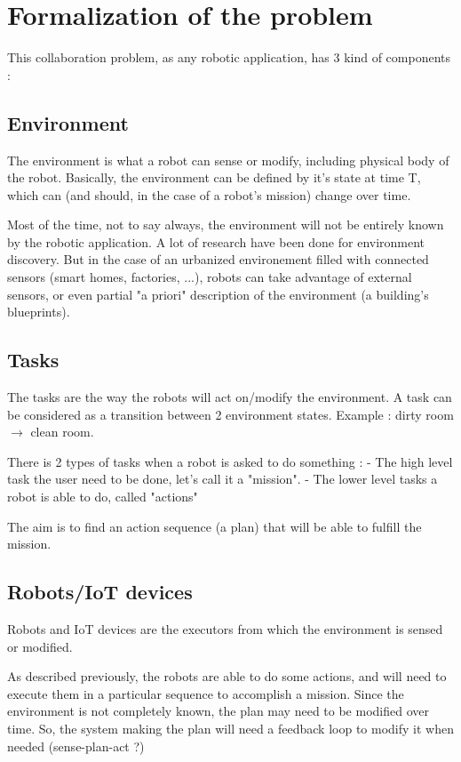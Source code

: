 \section{Formalization of the problem}

This collaboration problem, as any robotic application, has 3 kind of components : 

\subsection{Environment}

The environment is what a robot can sense or modify, including physical body of the robot.
Basically, the environment can be defined by it's state at time T, which can (and should, in the case of a robot's mission) change over time.

Most of the time, not to say always, the environment will not be entirely known by the robotic application.
A lot of research have been done for environment discovery.
But in the case of an urbanized environement filled with connected sensors (smart homes, factories, ...), robots can take advantage of external sensors, or even partial "a priori" description of the environment (a building's blueprints).

\subsection{Tasks}

The tasks are the way the robots will act on/modify the environment.
A task can be considered as a transition between 2 environment states.
Example : dirty room $\rightarrow$ clean room.

There is 2 types of tasks when a robot is asked to do something : 
 - The high level task the user need to be done, let's call it a "mission".
 - The lower level tasks a robot is able to do, called "actions"

The aim is to find an action sequence (a plan) that will be able to fulfill the mission.

\subsection{Robots/IoT devices}

Robots and IoT devices are the executors from which the environment is sensed or modified.

As described previously, the robots are able to do some actions, and will need to execute them in a particular sequence to accomplish a mission.
Since the environment is not completely known, the plan may need to be modified over time.
So, the system making the plan will need a feedback loop to modify it when needed (sense-plan-act ?)